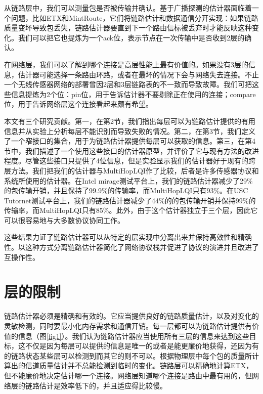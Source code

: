 \documentclass[12pt,a4paper]{article}
\begin{document}
从链路层中，我们可以测量包是否被传输并确认。基于广播探测的估计器面临着一个问题，比如ETX和MintRoute，它们将链路估计和数据通信分开实现：如果链路质量变坏导致包丢失，链路估计器要直到下一个路由信标被丢弃时才能反映这种变化。我们可以把它也提炼为一个ack位，表示节点在一次传输中是否收到2层的确认。

在网络层，我们可以了解到哪个连接是高层性能上最有价值的。如果没有3层的信息，估计器可能选择一条路由环路，或者在最坏的情况下会与网络失去连接。不止一个无线传感器网络的部署曾因2层和3层链路表的不一致而导致故障。我们可把这些信息提炼为2个位：pin位，用于告诉估计器不要剔除正在使用的连接；compare位，用于告诉网络层这个连接看起来颇有希望。

本文有三个研究贡献。第一，在第2节，我们指出每层可以为链路估计提供的有用信息并从实验上分析每层不能识别而导致失败的情况。第二，在第3节，我们定义了一个窄接口的集合，用于为链路估计器提供每层可以获取的信息。第三，在第4节中，我们描述了一个使用这些接口的估计器原型，并评价了它与现有方法的改进程度。尽管这些接口只提供了4位信息，但是实验显示我们的估计器好于现有的跨层方法。我们把我们的估计器与MultiHopLQI作了比较，后者是许多传感器协议和系统所使用的估计器。在Intel mirage测试平台上，我们的链路估计器减少了29\%的包传输开销，并且保持了99.9\%的传输率，而MultiHopLQI只有93\%。在USC Tutornet测试平台上，我们的链路估计器减少了44\%的的包传输开销并保持99\%的传输率，而MultiHopLQI只有85\%。此外，由于这个估计器独立于三个层，因此它可以很容易地与大多数协议协同工作。

这些结果力证了链路估计器可以从特定的层实现中分离出来并保持高效性和精确性。以这种方式分离链路估计器简化了网络协议栈并促进了协议的演进并且改进了互操作性。

\section{层的限制}
链路估计器必须是精确和有效的。它应当提供良好的链路质量估计，以及对变化的灵敏检测，同时要最小化内存需求和通信开销。每一层都可以为链路估计提供有价值的信息（图\ref{fig1}）。我们认为链路估计器应当使用所有三层的信息来达到这些目标，这不仅是因为每层可以提供的信息是唯一的或者是能更廉价地获得，还因为有的链路状态某些层可以检测到而其它的则不可以。根据物理层中每个包的质量所计算出的信道质量估计并不总能检测到临时的变化。链路层可以精确地计算ETX，但不能廉价地决定估计哪一个连接。网络层知道哪个连接是路由中最有用的，但网络层的链路估计是效率低下的，并且适应得比较慢。
\end{document}
